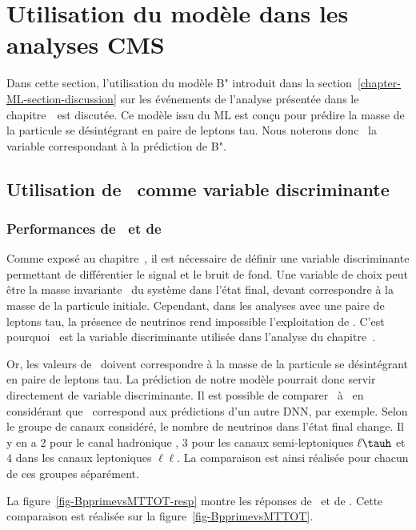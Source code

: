 \section{Utilisation du modèle dans les analyses CMS}\label{chapter-ML-section-use_HTT}
Dans cette section, l'utilisation du modèle B" introduit dans la section~\ref{chapter-ML-section-discussion} sur les événements de l'analyse présentée dans le chapitre~\ est discutée.
Ce modèle issu du ML est conçu pour prédire la masse de la particule se désintégrant en paire de leptons tau.
Nous noterons donc \mml\ la variable correspondant à la prédiction de B".
\subsection{Utilisation de \mml\ comme variable discriminante}
\subsubsection{Performances de \mml\ et de \mTtot}
Comme exposé au chapitre~,
il est nécessaire de définir une variable discriminante
permettant de différentier le signal et le bruit de fond.
Une variable de choix peut être la masse invariante \minv\ du système dans l'état final,
devant correspondre à la masse de la particule initiale.
Cependant, dans les analyses avec une paire de leptons tau,
la présence de neutrinos rend impossible l'exploitation de \minv.
C'est pourquoi
\mTtot\ est la variable discriminante
utilisée dans l'analyse du chapitre~.
\par
Or, les valeurs de \mml\ doivent correspondre à la masse de la particule se désintégrant en paire de leptons tau.
La prédiction de notre modèle
pourrait donc servir directement de variable discriminante.
Il est possible de comparer \mml\ à \mTtot\ en considérant que \mTtot\ correspond aux prédictions d'un autre DNN, par exemple.
Selon le groupe de canaux considéré, le nombre de neutrinos dans l'état final change.
Il y en a
2 pour le canal hadronique \tauh\tauh,
3 pour les canaux semi-leptoniques $\ell\tauh$ et
4 dans les canaux leptoniques $\ell\ell$.
La comparaison est ainsi réalisée pour chacun de ces groupes séparément.
\par
La figure~\ref{fig-BpprimevsMTTOT-resp} montre les réponses de \mml\ et de \mTtot.
Cette comparaison est réalisée sur la figure~\ref{fig-BpprimevsMTTOT}.
